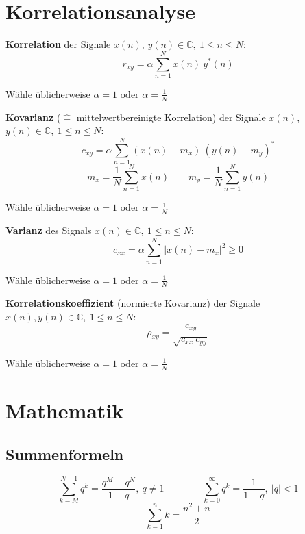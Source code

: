 \documentclass[10pt,a4paper]{article}
\begin{document}
\section*{Korrelationsanalyse}
\begin{multicols}{2}
	\begin{adjustbox}{valign=t,center=0.48\textwidth,margin=1ex,minipage=[t][][t]{0.43\textwidth},bgcolor=white,cfbox=black 1.5pt 0pt 1pt}
		\textbf{Korrelation} der Signale $x(n)$, $y(n) \in \mathbb C, ~ 1 \leq n \leq N$:
		\[ r_{xy} = \alpha \sum_{n = 1}^N x(n) ~ y^*(n) \]

		Wähle üblicherweise $\alpha = 1$ oder $\alpha = \frac{1}{N}$
	\end{adjustbox}

	\begin{adjustbox}{valign=t,center=0.48\textwidth,margin=1ex,minipage=[t][][t]{0.43\textwidth},bgcolor=white,cfbox=black 1.5pt 0pt 1pt}
		\textbf{Kovarianz} ($\hat =$ mittelwertbereinigte Korrelation) der Signale $x(n)$, $y(n) \in \mathbb C, ~ 1 \leq n \leq N$:
		\[ c_{xy} = \alpha \sum_{n = 1}^N (x(n) - m_x) ~ (y(n) - m_y)^* \]
		\[ m_x = \frac{1}{N} \sum_{n = 1}^N x(n) \qquad m_y = \frac{1}{N} \sum_{n = 1}^N y(n) \]

		Wähle üblicherweise $\alpha = 1$ oder $\alpha = \frac{1}{N}$
	\end{adjustbox}

	\begin{adjustbox}{valign=t,center=0.48\textwidth,margin=1ex,minipage=[t][][t]{0.43\textwidth},bgcolor=white,cfbox=black 1.5pt 0pt 1pt}
		\textbf{Varianz} des Signals $x(n) \in \mathbb C, ~ 1 \leq n \leq N$:
		\[ c_{xx} = \alpha \sum_{n = 1}^N \left| x(n) - m_x \right|^2 \geq 0 \]

		Wähle üblicherweise $\alpha = 1$ oder $\alpha = \frac{1}{N}$
	\end{adjustbox}

	\begin{adjustbox}{valign=t,center=0.48\textwidth,margin=1ex,minipage=[t][][t]{0.43\textwidth},bgcolor=white,cfbox=black 1.5pt 0pt 1pt}
		\textbf{Korrelationskoeffizient} (normierte Kovarianz) der Signale $x(n), y(n) \in \mathbb C, ~ 1 \leq n \leq N$:
		\[ \rho_{xy} = \frac{c_{xy}}{\sqrt{c_{xx} ~ c_{yy}}} \]

		Wähle üblicherweise $\alpha = 1$ oder $\alpha = \frac{1}{N}$
	\end{adjustbox}
\end{multicols}


\section*{Mathematik}
\subsection*{Summenformeln}
\[ \sum_{k = M}^{N - 1} q^k = \frac{q^M - q^N}{1 - q}, ~ q \neq 1  \qquad \qquad \sum_{k = 0}^{\infty} q^k = \frac{1}{1 - q}, ~ |q| < 1 \]
\[ \sum_{k = 1}^{n} k = \frac{n^2 + n}{2} \]
\end{document}
